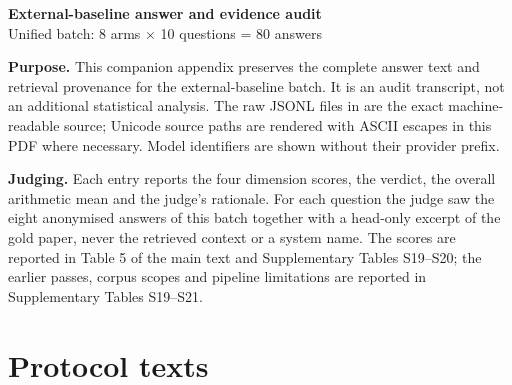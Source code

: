\documentclass[10pt]{article}
\begin{document}
\begin{center}{\Large\bfseries External-baseline answer and evidence audit}\\[4pt]{\normalsize Unified batch: 8 arms $\times$ 10 questions = 80 answers}\end{center}
\textbf{Purpose.} This companion appendix preserves the complete answer text and retrieval provenance for the external-baseline batch. It is an audit transcript, not an additional statistical analysis. The raw JSONL files in  are the exact machine-readable source; Unicode source paths are rendered with ASCII escapes in this PDF where necessary. Model identifiers are shown without their provider prefix.

\textbf{Judging.} Each entry reports the four dimension scores, the verdict, the overall arithmetic mean and the judge's rationale. For each question the judge saw the eight anonymised answers of this batch together with a head-only excerpt of the gold paper, never the retrieved context or a system name. The scores are reported in Table 5 of the main text and Supplementary Tables S19--S20; the earlier passes, corpus scopes and pipeline limitations are reported in Supplementary Tables S19--S21.

\tableofcontents
\clearpage
\section*{Protocol texts}
\end{document}
